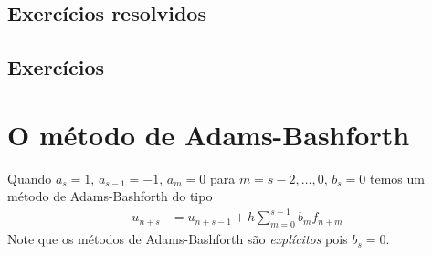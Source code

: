 \subsection*{Exercícios resolvidos}

\emconstrucao

\subsection*{Exercícios}

\emconstrucao


\section{O método de Adams-Bashforth}
Quando $a_s=1$, $a_{s-1}=-1$, $a_m=0$ para $m=s-2,\ldots ,0$, $b_s=0$ temos um método de Adams-Bashforth do tipo
\begin{eqnarray}\label{AB}
  u_{n+s}  &= u_{n+s-1}  + h \sum_{m=0}^{s-1} b_m f_{n+m}
\end{eqnarray}
Note que os métodos de Adams-Bashforth são \emph{explícitos} pois $b_s=0$.



